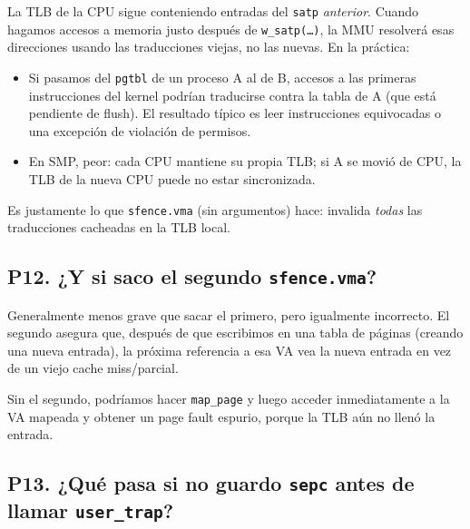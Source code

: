 \documentclass[11pt,a4paper]{article}
\begin{document}
\begin{respuesta}
La TLB de la CPU sigue conteniendo entradas del \texttt{satp}
\emph{anterior}. Cuando hagamos accesos a memoria justo después de
\texttt{w\_satp(\dots)}, la MMU resolverá esas direcciones usando
las traducciones viejas, no las nuevas. En la práctica:

\begin{itemize}[nosep,leftmargin=*]
    \item Si pasamos del \texttt{pgtbl} de un proceso A al de B,
        accesos a las primeras instrucciones del kernel podrían
        traducirse contra la tabla de A (que está pendiente de
        flush). El resultado típico es leer instrucciones
        equivocadas o una excepción de violación de permisos.
    \item En SMP, peor: cada CPU mantiene su propia TLB; si A se
        movió de CPU, la TLB de la nueva CPU puede no estar
        sincronizada.
\end{itemize}

Es justamente lo que \texttt{sfence.vma} (sin argumentos) hace:
invalida \emph{todas} las traducciones cacheadas en la TLB local.
\end{respuesta}

\subsection*{P12. ¿Y si saco el segundo \texttt{sfence.vma}?}

\begin{respuesta}
Generalmente menos grave que sacar el primero, pero igualmente
incorrecto. El segundo asegura que, después de que escribimos en
una tabla de páginas (creando una nueva entrada), la próxima
referencia a esa VA vea la nueva entrada en vez de un viejo cache
miss/parcial.

Sin el segundo, podríamos hacer \texttt{map\_page} y luego acceder
inmediatamente a la VA mapeada y obtener un page fault espurio,
porque la TLB aún no llenó la entrada.
\end{respuesta}

\subsection*{P13. ¿Qué pasa si no guardo \texttt{sepc} antes de llamar \texttt{user\_trap}?}
\end{document}
